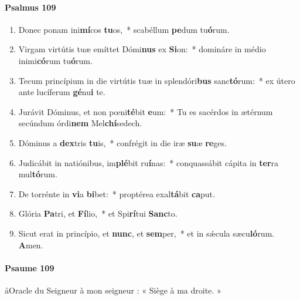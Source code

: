 \documentclass[twoside]{article}
\begin{document}
\begin{paracol}[1]{2}
\switchcolumn*

\paragraph{Psalmus 109}


\begin{enumerate}[wide, itemsep=0mm, labelwidth=!, labelindent=0pt, label=\color{gregoriocolor}\theenumi]
\setcounter{enumi}{1}
\item Donec ponam ini\textbf{mí}cos \textbf{tu}os,~* scabéllum \textbf{pe}dum tu\textbf{ó}rum.
\item Virgam virtútis tuæ emíttet Dómi\textbf{nus} ex \textbf{Si}on:~* domináre in médio inimi\textbf{có}rum tu\textbf{ó}rum.
\item Tecum princípium in die virtútis tuæ in splendóri\textbf{bus} sanc\textbf{tó}rum:~* ex útero ante lucíferum \textbf{gé}nu\textbf{i} te.
\item Jurávit Dóminus, et non pœni\textbf{té}bit \textbf{e}um:~* Tu es sacérdos in ætérnum secúndum órdi\textbf{nem} Mel\textbf{chí}sedech.
\newpage
\item Dóminus a \textbf{dex}tris \textbf{tu}is,~* confrégit in die iræ \textbf{su}æ \textbf{re}ges.
\item Judicábit in natiónibus, im\textbf{plé}bit ru\textbf{í}nas:~* conquassábit cápita in \textbf{ter}ra mul\textbf{tó}rum.
\item De torrénte in \textbf{vi}a \textbf{bi}bet:~* proptérea exal\textbf{tá}bit \textbf{ca}put.
\item Glória \textbf{Pa}tri, et \textbf{Fí}lio,~* et Spi\textbf{rí}tui \textbf{Sanc}to.
\item Sicut erat in princípio, et \textbf{nunc}, et \textbf{sem}per,~* et in sǽcula sæcu\textbf{ló}rum. \textbf{A}men.
\end{enumerate}

\switchcolumn


\paragraph{Psaume 109}
\aa Oracle du Seigneur à mon seigneur : « Siège à ma droite. »



\end{paracol}
\end{document}

